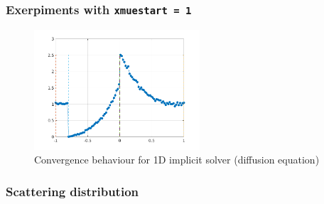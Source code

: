 \documentclass[../main/main.tex]{subfiles}
\begin{document}
\subsubsection{Exerpiments with \texttt{xmuestart = 1}}
\label{Experiments_xmuestart_1}

\begin{figure}[!htp]
\centering
\includegraphics[width=0.55\textwidth]{../../two_resonance_lines/figures/reference_solution_xmuestart.png}
\caption{Convergence behaviour for 1D implicit solver (diffusion equation)}
\label{1D_implicit_diffusion}
\end{figure}

\subsubsection{Scattering distribution}
\end{document}
